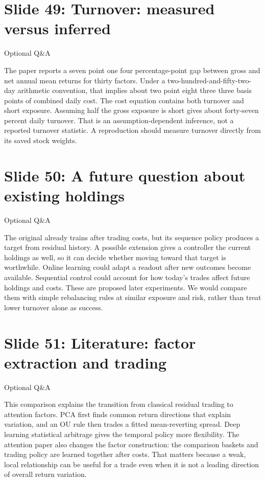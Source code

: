 \documentclass[11pt]{article}
\begin{document}
\section*{Slide 49: Turnover: measured versus inferred}

\textcolor{SBred}{Optional Q\&A}

The paper reports a seven point one four percentage-point gap between gross and net annual mean returns for thirty factors. Under a two-hundred-and-fifty-two-day arithmetic convention, that implies about two point eight three three basis points of combined daily cost. The cost equation contains both turnover and short exposure. Assuming half the gross exposure is short gives about forty-seven percent daily turnover. That is an assumption-dependent inference, not a reported turnover statistic. A reproduction should measure turnover directly from its saved stock weights.

\section*{Slide 50: A future question about existing holdings}

\textcolor{SBred}{Optional Q\&A}

The original already trains after trading costs, but its sequence policy produces a target from residual history. A possible extension gives a controller the current holdings as well, so it can decide whether moving toward that target is worthwhile. Online learning could adapt a readout after new outcomes become available. Sequential control could account for how today's trades affect future holdings and costs. These are proposed later experiments. We would compare them with simple rebalancing rules at similar exposure and risk, rather than treat lower turnover alone as success.

\section*{Slide 51: Literature: factor extraction and trading}

\textcolor{SBred}{Optional Q\&A}

This comparison explains the transition from classical residual trading to attention factors. PCA first finds common return directions that explain variation, and an OU rule then trades a fitted mean-reverting spread. Deep learning statistical arbitrage gives the temporal policy more flexibility. The attention paper also changes the factor construction: the comparison baskets and trading policy are learned together after costs. That matters because a weak, local relationship can be useful for a trade even when it is not a leading direction of overall return variation.
\end{document}
